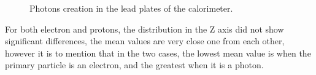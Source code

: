 \begin{figure}[htb!]
  \hspace{1em}

  \caption{Photons creation in the lead plates of the calorimeter.}\label{fig:photons-creation-lead}

\end{figure}

For both electron and protons, the distribution in the Z axis did not show
significant differences, the mean values are very close one from each other,
however it is to mention that in the two cases, the lowest mean value is when
the primary particle is an electron, and the greatest when it is a photon.

